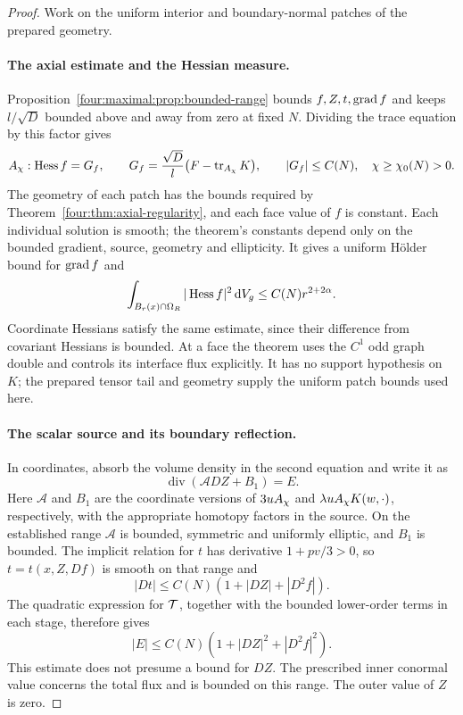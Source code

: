 \begin{proof}
Work on the uniform interior and boundary-normal patches of the
prepared geometry.

\paragraph{The axial estimate and the Hessian measure.}
Proposition~\ref{four:maximal:prop:bounded-range} bounds $f,Z,t,\operatorname{grad} f$ and
keeps $l/\sqrt D$ bounded above and away from zero at fixed $N$.
Dividing the trace equation by this factor gives
\begin{equation}\label{four:maximal:reg:f-normalized}
 A_\chi:\operatorname{Hess} f=G_f,\qquad
 G_f=\frac{\sqrt D}{l}
             \bigl(F-\operatorname{tr}_{A_\chi}K\bigr),\qquad
 |G_f|\le C(N),\quad \chi\ge\chi _0(N)>0.
\end{equation}
The geometry of each patch has the bounds required by
Theorem~\ref{four:thm:axial-regularity}, and each face value of $f$
is constant.  Each individual solution is smooth; the theorem's
constants depend only on the bounded gradient, source, geometry and
ellipticity.  It gives a uniform H\"older bound for $\operatorname{grad} f$ and
\begin{equation}\label{four:maximal:reg:f-hessian-measure}
 \int_{B_r(x)\cap\Omega_R}|\operatorname{Hess} f|^2\,\mathrm d V_g
                              \le C(N)r^{2+2\alpha}.
\end{equation}
Coordinate Hessians satisfy the same estimate, since their difference
from covariant Hessians is bounded.  At a face the theorem uses the
$C^1$ odd graph double and controls its interface flux explicitly.
It has no support hypothesis on $K$; the prepared tensor tail and
geometry supply the uniform patch bounds used here.

\paragraph{The scalar source and its boundary reflection.}
In coordinates, absorb the volume density in the second equation and
write it as
\begin{equation}\label{four:maximal:reg:natural-equation}
 \operatorname{div}(\mathcal A DZ+B_1)=E.
\end{equation}
Here $\mathcal A$ and $B_1$ are the coordinate versions of $3uA_\chi$
and $\lambda uA_\chi K(w,\cdot)$, respectively, with the appropriate
homotopy factors in the source.  On the established range
$\mathcal A$ is bounded, symmetric and uniformly elliptic, and $B_1$
is bounded.  The implicit relation for $t$ has derivative
$1+pv/3>0$, so $t=t(x,Z,Df)$ is smooth on that range and
\begin{equation}\label{four:maximal:reg:t-chain}
 |Dt|\le C(N)(1+|DZ|+|D^2f|).
\end{equation}
The quadratic expression for $\mathcal T$, together with the bounded
lower-order terms in each stage, therefore gives
\begin{equation}\label{four:maximal:reg:coupled-growth}
 |E|\le C(N)(1+|DZ|^2+|D^2f|^2).
\end{equation}
This estimate does not presume a bound for $DZ$.  The prescribed
inner conormal value concerns the total flux and is bounded on this
range.  The outer value of $Z$ is zero.


\end{proof}
